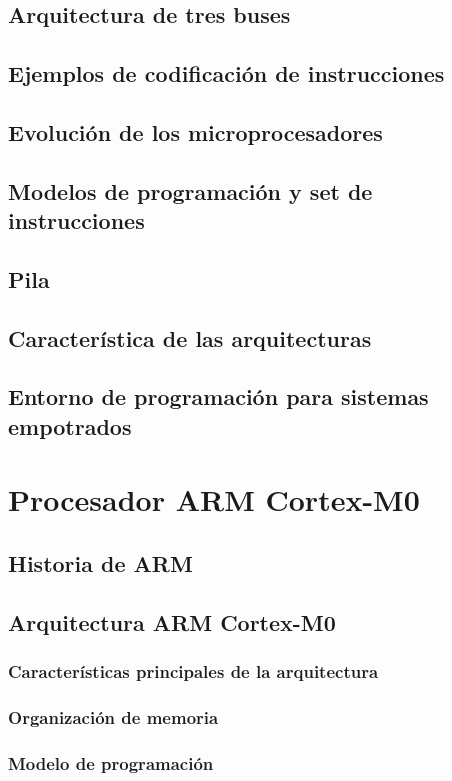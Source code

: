 \documentclass[a4paper]{book}
\begin{document}
\section{Arquitectura de tres buses}
\section{Ejemplos de codificación de instrucciones}
\section{Evolución de los microprocesadores}
\section{Modelos de programación y set de instrucciones}
\section{Pila}
\section{Característica de las arquitecturas}
\section{Entorno de programación para sistemas empotrados}

\chapter{Procesador ARM Cortex-M0}
\section{Historia de ARM}
\section{Arquitectura ARM Cortex-M0}
\subsection{Características principales de la arquitectura}
\subsection{Organización de memoria}
\subsection{Modelo de programación}
\end{document}
